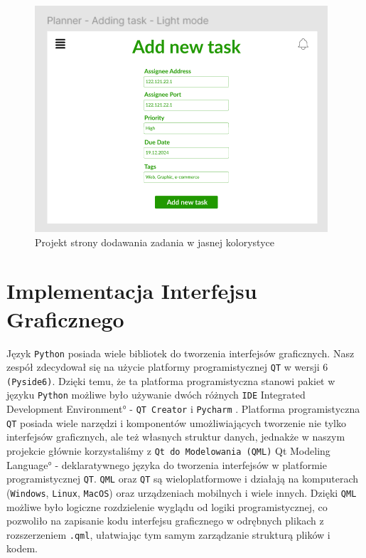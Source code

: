 \begin{figure}[!ht]
    \centering
    \includegraphics[width=0.75\linewidth]{Images/figma_projektowanie_3.png}
    \caption{Projekt strony dodawania zadania w jasnej kolorystyce}
    \label{fig:enter-label}
\end{figure}

\section{Implementacja Interfejsu Graficznego}
\label{sec:ImplementacjaInterfejsuGraficznego}
Język \texttt{Python} posiada wiele bibliotek do tworzenia interfejsów graficznych. Nasz zespół zdecydował się na użycie platformy programistycznej \texttt{QT} w wersji 6 \texttt{(Pyside6)}. Dzięki temu, że ta platforma programistyczna stanowi pakiet w języku \texttt{Python} możliwe było używanie dwóch różnych \texttt{IDE} \ang{Integrated Development Environment} - \texttt{QT Creator} \cite{QT-Creator} i \texttt{Pycharm} \cite{Pycharm}.
Platforma programistyczna \texttt{QT} posiada wiele narzędzi i komponentów umożliwiających tworzenie nie tylko interfejsów graficznych, ale też własnych struktur danych, jednakże w naszym projekcie głównie korzystaliśmy z \texttt{Qt do Modelowania (QML)} \ang{Qt Modeling Language} - deklaratywnego języka do tworzenia interfejsów w platformie programistycznej \texttt{QT}. \texttt{QML} oraz \texttt{QT} są wieloplatformowe i działają na komputerach (\texttt{Windows}, \texttt{Linux}, \texttt{MacOS}) oraz urządzeniach mobilnych i wiele innych.
Dzięki \texttt{QML} możliwe było logiczne rozdzielenie wyglądu od logiki programistycznej, co pozwoliło na zapisanie kodu interfejsu graficznego w odrębnych plikach z rozszerzeniem \texttt{.qml}, ułatwiając tym samym zarządzanie strukturą plików i kodem.

